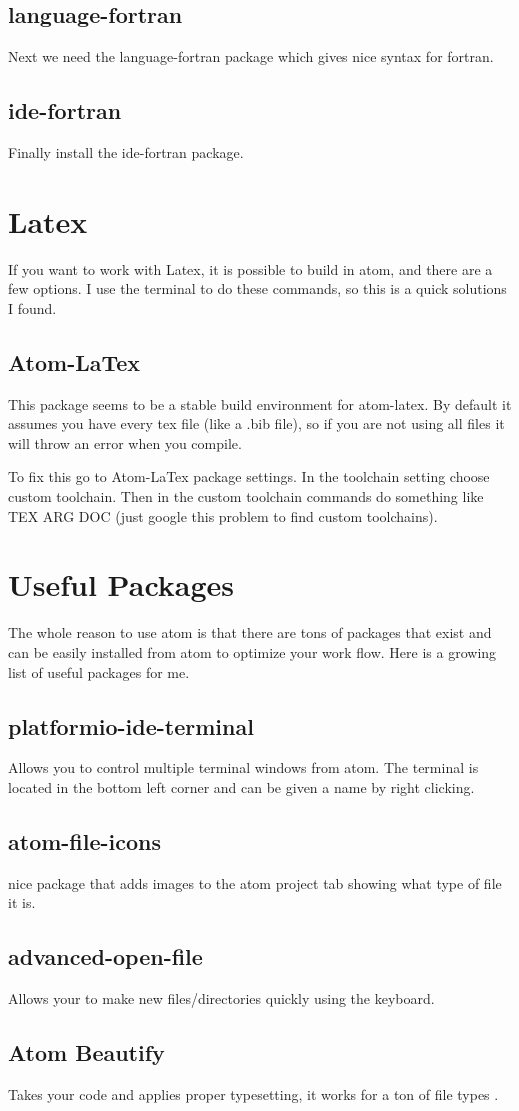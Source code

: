 \documentclass[preprint,showpacs,preprintnumbers,amsmath,amssymb]{revtex4}
\begin{document}
\subsection{language-fortran}
Next we need the language-fortran package which gives nice syntax for fortran.

\subsection{ide-fortran}
Finally install the ide-fortran package.

\section{Latex}
If you want to work with Latex, it is possible to build in atom, and there are a
few options.
I use the terminal to do these commands, so this is a quick solutions I found.

\subsection{Atom-LaTex}
This package seems to be a stable build environment for atom-latex.
By default it assumes you have every tex file (like a .bib file), so if
you are not using  all files it will throw an error when you compile.

To fix this go to Atom-LaTex package settings.
In the toolchain setting choose custom toolchain.
Then in the custom toolchain commands do something like TEX ARG DOC
(just google this problem to find custom toolchains).

\section{Useful Packages}
The whole reason to use atom is that there are tons of packages that exist and
can be easily installed from atom to optimize your work flow.
Here is a growing list of useful packages for me.

\subsection{platformio-ide-terminal}
Allows you to control multiple terminal windows from atom.
The terminal is located in the bottom left corner and can be given a name by
right clicking.

\subsection{atom-file-icons}
nice package that adds images to the atom project tab showing what type of file
it is.

\subsection{advanced-open-file}
Allows your to make new files/directories quickly using the keyboard.

\subsection{Atom Beautify}
Takes your code and applies proper typesetting, it works for a ton of file types
.
\end{document}
